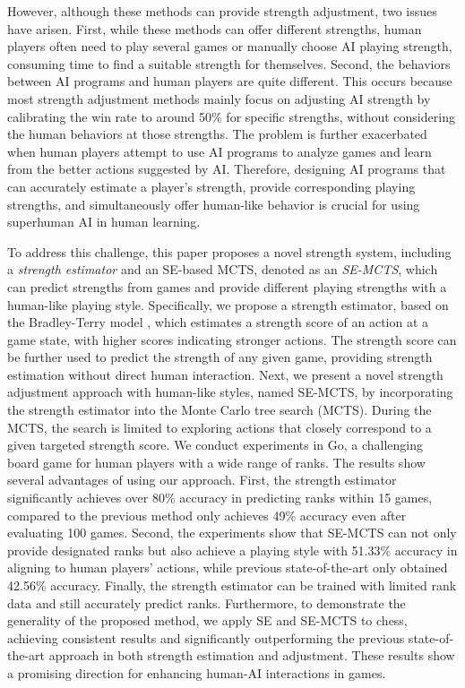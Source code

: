 However, although these methods can provide strength adjustment, two issues have arisen.
First, while these methods can offer different strengths, human players often need to play several games or manually choose AI playing strength, consuming time to find a suitable strength for themselves.
Second, the behaviors between AI programs and human players are quite different.
This occurs because most strength adjustment methods mainly focus on adjusting AI strength by calibrating the win rate to around 50\% for specific strengths, without considering the human behaviors at those strengths.
The problem is further exacerbated when human players attempt to use AI programs to analyze games and learn from the better actions suggested by AI.
Therefore, designing AI programs that can accurately estimate a player's strength, provide corresponding playing strengths, and simultaneously offer human-like behavior is crucial for using superhuman AI in human learning.

To address this challenge, this paper proposes a novel strength system, including a \textit{strength estimator} and an SE-based MCTS, denoted as an \textit{SE-MCTS}, which can predict strengths from games and provide different playing strengths with a human-like playing style.
Specifically, we propose a strength estimator, based on the Bradley-Terry model \citep{bradley_rank_1952}, which estimates a strength score of an action at a game state, with higher scores indicating stronger actions.
The strength score can be further used to predict the strength of any given game, providing strength estimation without direct human interaction.
Next, we present a novel strength adjustment approach with human-like styles, named SE-MCTS, by incorporating the strength estimator into the Monte Carlo tree search (MCTS).
During the MCTS, the search is limited to exploring actions that closely correspond to a given targeted strength score.
We conduct experiments in Go, a challenging board game for human players with a wide range of ranks.
The results show several advantages of using our approach.
First, the strength estimator significantly achieves over 80\% accuracy in predicting ranks within 15 games, compared to the previous method only achieves 49\% accuracy even after evaluating 100 games.
Second, the experiments show that SE-MCTS can not only provide designated ranks but also achieve a playing style with 51.33\% accuracy in aligning to human players' actions, while previous state-of-the-art only obtained 42.56\% accuracy.
Finally, the strength estimator can be trained with limited rank data and still accurately predict ranks.
Furthermore, to demonstrate the generality of the proposed method, we apply SE and SE-MCTS to chess, achieving consistent results and significantly outperforming the previous state-of-the-art approach in both strength estimation and adjustment.
These results show a promising direction for enhancing human-AI interactions in games.

